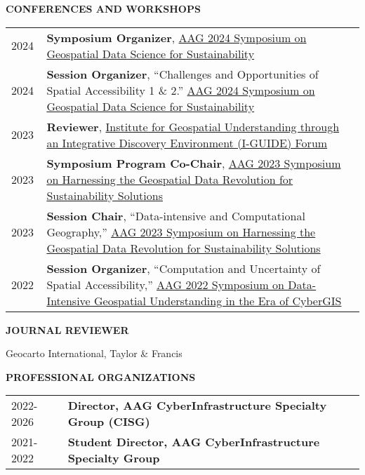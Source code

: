 \documentclass{acmcv}
\begin{document}
    \textbf{\uppercase{Conferences and Workshops}}
    \begin{longtable}{p{0.1\linewidth} p{0.9\linewidth}}
        2024 & \textbf{Symposium Organizer}, \href{https://iguide.illinois.edu/aag-2024-symposium-on-geospatial-data-science-for-sustainability/}{AAG 2024 Symposium on Geospatial Data Science for Sustainability}\\

        2024 & \textbf{Session Organizer}, ``Challenges and Opportunities of Spatial Accessibility 1 \& 2.'' \href{https://iguide.illinois.edu/aag-2024-symposium-on-geospatial-data-science-for-sustainability/}{AAG 2024 Symposium on Geospatial Data Science for Sustainability}\\
        
        2023 & \textbf{Reviewer}, \href{https://iguide.illinois.edu/forum-2023/}{Institute for Geospatial Understanding through an Integrative Discovery Environment (I-GUIDE) Forum}\\

        2023 & \textbf{Symposium Program Co-Chair}, \href{https://iguide.illinois.edu/aag-2023-symposium-on-harnessing-the-geospatial-data-revolution-for-sustainability-solutions/}{AAG 2023 Symposium on Harnessing the Geospatial Data Revolution for Sustainability Solutions}\\

        2023 & \textbf{Session Chair}, ``Data-intensive and Computational Geography,'' \href{https://iguide.illinois.edu/aag-2023-symposium-on-harnessing-the-geospatial-data-revolution-for-sustainability-solutions/}{AAG 2023 Symposium on Harnessing the Geospatial Data Revolution for Sustainability Solutions}\\

        2022 & \textbf{Session Organizer}, ``Computation and Uncertainty of Spatial Accessibility,'' \href{https://cybergis.illinois.edu/aag-symposium-2022/}{AAG 2022 Symposium on Data-Intensive Geospatial Understanding in the Era of CyberGIS}\\
    \end{longtable}

    \textbf{\uppercase{Journal Reviewer}}
    \begin{titemize}
        \item Geocarto International, Taylor \& Francis
    \end{titemize}
    \vspace*{.25cm}
    \textbf{\uppercase{Professional Organizations}}
    \begin{longtable}{p{0.16\linewidth} p{0.84\linewidth}}

        2022-2026 & \textbf{Director, AAG CyberInfrastructure Specialty Group (CISG)} \\

        2021-2022 & \textbf{Student Director, AAG CyberInfrastructure Specialty Group}
    \end{longtable}
\end{document}
